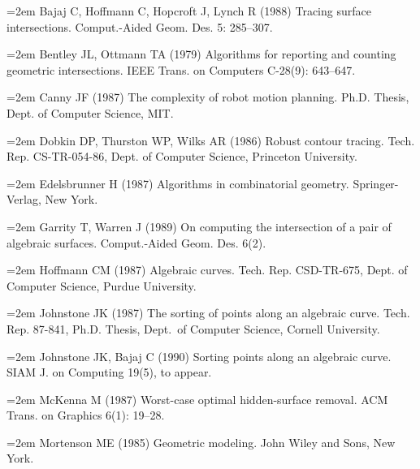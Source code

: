 \hangindent=2em  %
\noindent 
Bajaj C, Hoffmann C, Hopcroft J, Lynch R (1988)
Tracing surface intersections.
Comput.-Aided Geom. Des. 5: 285--307.

\hangindent=2em  %
\noindent 
Bentley JL, Ottmann TA (1979)
Algorithms for reporting and counting geometric intersections.
IEEE Trans. on Computers C-28(9): 643--647.

\hangindent=2em  %
\noindent 
Canny JF (1987) The complexity of robot motion planning.
Ph.D. Thesis, Dept. of Computer Science, MIT.

\hangindent=2em  %
\noindent 
Dobkin DP, Thurston WP, Wilks AR (1986)
Robust contour tracing.
Tech. Rep. CS-TR-054-86, Dept. of Computer Science, Princeton University.

\hangindent=2em  %
\noindent 
Edelsbrunner H (1987) Algorithms in combinatorial geometry.
Springer-Verlag, New York.

\hangindent=2em  %
\noindent 
Garrity T, Warren J (1989) On computing the intersection of a pair of algebraic surfaces.
Comput.-Aided Geom. Des. 6(2).

\hangindent=2em  %
\noindent 
Hoffmann CM (1987) 
Algebraic curves.
Tech. Rep. CSD-TR-675, Dept. of Computer Science, Purdue University.

\hangindent=2em  %
\noindent 
Johnstone JK (1987) The sorting of points along an algebraic curve.
Tech. Rep. 87-841, Ph.D. Thesis, Dept.\ of Computer Science, Cornell University.

\hangindent=2em  %
\noindent 
Johnstone JK, Bajaj C (1990) Sorting points along an algebraic curve.
SIAM J. on Computing 19(5), to appear.

\hangindent=2em  %
\noindent 
McKenna M (1987)
Worst-case optimal hidden-surface removal.
ACM Trans. on Graphics 6(1): 19--28.


\hangindent=2em  %
\noindent 
Mortenson ME (1985) Geometric modeling.
John Wiley and Sons, New York.

